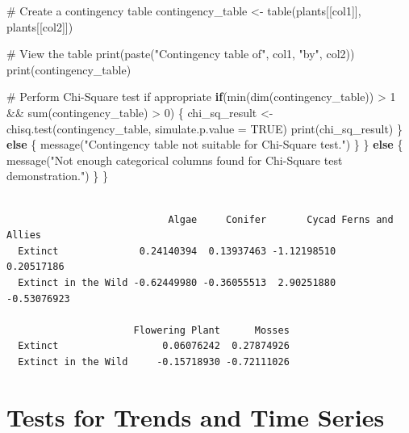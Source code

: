 \documentclass[
  letterpaper,
]{book}
\newenvironment{Shaded}{\begin{snugshade}}{\end{snugshade}}
\newcommand{\AttributeTok}[1]{\textcolor[rgb]{0.40,0.45,0.13}{#1}}
\newcommand{\CommentTok}[1]{\textcolor[rgb]{0.37,0.37,0.37}{#1}}
\newcommand{\ConstantTok}[1]{\textcolor[rgb]{0.56,0.35,0.01}{#1}}
\newcommand{\ControlFlowTok}[1]{\textcolor[rgb]{0.00,0.23,0.31}{\textbf{#1}}}
\newcommand{\DecValTok}[1]{\textcolor[rgb]{0.68,0.00,0.00}{#1}}
\newcommand{\FunctionTok}[1]{\textcolor[rgb]{0.28,0.35,0.67}{#1}}
\newcommand{\NormalTok}[1]{\textcolor[rgb]{0.00,0.23,0.31}{#1}}
\newcommand{\OtherTok}[1]{\textcolor[rgb]{0.00,0.23,0.31}{#1}}
\newcommand{\SpecialCharTok}[1]{\textcolor[rgb]{0.37,0.37,0.37}{#1}}
\newcommand{\StringTok}[1]{\textcolor[rgb]{0.13,0.47,0.30}{#1}}
\begin{document}
\begin{Shaded}
\begin{Highlighting}[]
    \CommentTok{\# Create a contingency table}
\NormalTok{    contingency\_table }\OtherTok{\textless{}{-}} \FunctionTok{table}\NormalTok{(plants[[col1]], plants[[col2]])}
    
    \CommentTok{\# View the table}
    \FunctionTok{print}\NormalTok{(}\FunctionTok{paste}\NormalTok{(}\StringTok{"Contingency table of"}\NormalTok{, col1, }\StringTok{"by"}\NormalTok{, col2))}
    \FunctionTok{print}\NormalTok{(contingency\_table)}
    
    \CommentTok{\# Perform Chi{-}Square test if appropriate}
    \ControlFlowTok{if}\NormalTok{(}\FunctionTok{min}\NormalTok{(}\FunctionTok{dim}\NormalTok{(contingency\_table)) }\SpecialCharTok{\textgreater{}} \DecValTok{1} \SpecialCharTok{\&\&} \FunctionTok{sum}\NormalTok{(contingency\_table) }\SpecialCharTok{\textgreater{}} \DecValTok{0}\NormalTok{) \{}
\NormalTok{      chi\_sq\_result }\OtherTok{\textless{}{-}} \FunctionTok{chisq.test}\NormalTok{(contingency\_table, }\AttributeTok{simulate.p.value =} \ConstantTok{TRUE}\NormalTok{)}
      \FunctionTok{print}\NormalTok{(chi\_sq\_result)}
\NormalTok{    \} }\ControlFlowTok{else}\NormalTok{ \{}
      \FunctionTok{message}\NormalTok{(}\StringTok{"Contingency table not suitable for Chi{-}Square test."}\NormalTok{)}
\NormalTok{    \}}
\NormalTok{  \} }\ControlFlowTok{else}\NormalTok{ \{}
    \FunctionTok{message}\NormalTok{(}\StringTok{"Not enough categorical columns found for Chi{-}Square test demonstration."}\NormalTok{)}
\NormalTok{  \}}
\NormalTok{\}}
\end{Highlighting}
\end{Shaded}

\begin{verbatim}
                     
                            Algae     Conifer       Cycad Ferns and Allies
  Extinct              0.24140394  0.13937463 -1.12198510       0.20517186
  Extinct in the Wild -0.62449980 -0.36055513  2.90251880      -0.53076923
                     
                      Flowering Plant      Mosses
  Extinct                  0.06076242  0.27874926
  Extinct in the Wild     -0.15718930 -0.72111026
\end{verbatim}

\section{Tests for Trends and Time
Series}\label{tests-for-trends-and-time-series}
\end{document}
